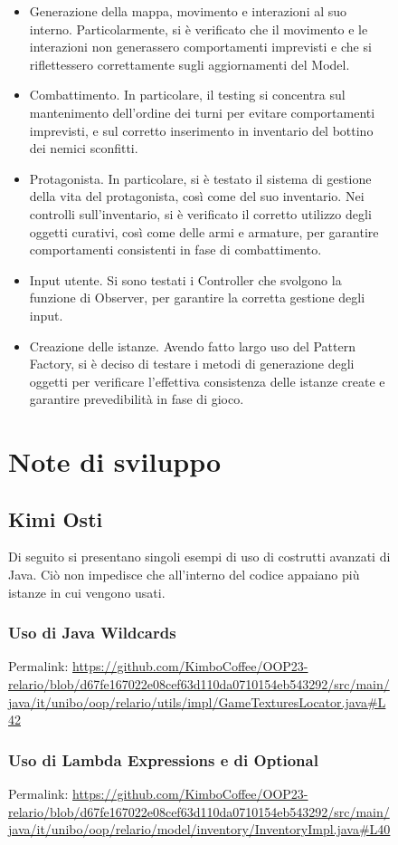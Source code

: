 \documentclass[a4paper,12pt]{report}
\begin{document}
\begin{figure}[H]
\begin{itemize}
	\item Generazione della mappa, movimento e interazioni al suo interno. Particolarmente, si è verificato che il movimento e le interazioni non generassero comportamenti imprevisti e che si riflettessero correttamente sugli aggiornamenti del Model.
	\item Combattimento. In particolare, il testing si concentra sul mantenimento dell’ordine dei turni per evitare comportamenti imprevisti, e sul corretto inserimento in inventario del bottino dei nemici sconfitti.
	\item Protagonista. In particolare, si è testato il sistema di gestione della vita del protagonista, così come del suo inventario. Nei controlli sull’inventario, si è verificato il corretto utilizzo degli oggetti curativi, così come delle armi e armature, per garantire comportamenti consistenti in fase di combattimento.
	\item Input utente. Si sono testati i Controller che svolgono la funzione di Observer, per garantire la corretta gestione degli input.
	\item Creazione delle istanze. Avendo fatto largo uso del Pattern Factory, si è deciso di testare i metodi di generazione degli oggetti per verificare l’effettiva consistenza delle istanze create e garantire prevedibilità in fase di gioco.
\end{itemize}

\section{Note di sviluppo}

\subsection{Kimi Osti}

Di seguito si presentano singoli esempi di uso di costrutti avanzati di Java. Ciò non impedisce che all'interno del codice appaiano più istanze in cui vengono usati.

\subsubsection{Uso di Java Wildcards}
Permalink: \url{https://github.com/KimboCoffee/OOP23-relario/blob/d67fe167022e08cef63d110da0710154eb543292/src/main/java/it/unibo/oop/relario/utils/impl/GameTexturesLocator.java#L42}

\subsubsection{Uso di Lambda Expressions e di Optional}
Permalink: \url{https://github.com/KimboCoffee/OOP23-relario/blob/d67fe167022e08cef63d110da0710154eb543292/src/main/java/it/unibo/oop/relario/model/inventory/InventoryImpl.java#L40}


\end{figure}
\end{document}
